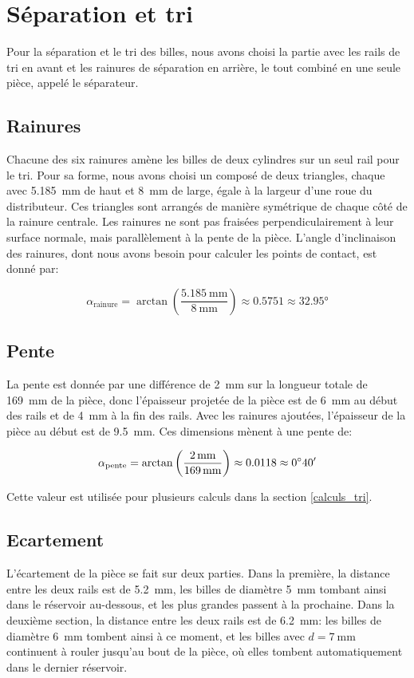 \section{Séparation et tri}
Pour la séparation et le tri des billes, nous avons choisi la partie avec les rails de tri en avant et les rainures de séparation en arrière, le tout combiné en une seule pièce, appelé le séparateur.

\subsection{Rainures}
Chacune des six rainures amène les billes de deux cylindres sur un seul rail pour le tri. Pour sa forme, nous avons choisi un composé de deux triangles, chaque avec \SI{5,185}{\milli\metre} de haut et \SI{8}{\milli\metre} de large, égale à la largeur d'une roue du distributeur. Ces triangles sont arrangés de manière symétrique de chaque côté de la rainure centrale. Les rainures ne sont pas fraisées perpendiculairement à leur surface normale, mais parallèlement à la pente de la pièce. L'angle d'inclinaison des rainures, dont nous avons besoin pour calculer les points de contact, est donné par:

\[\alpha_{\text{rainure}} = \arctan\left(\frac{\SI{5.185}{\milli\metre}}{\SI{8}{\milli\metre}}\right) \approx \num{0.5751} \approx \ang{32.95}\]

\subsection{Pente}
La pente est donnée par une différence de \SI{2}{\milli\metre} sur la longueur totale de \SI{169}{\milli\metre} de la pièce, donc l'épaisseur projetée de la pièce est de \SI{6}{\mm} au début des rails et de \SI{4}{\mm} à la fin  des rails. Avec les rainures ajoutées, l'épaisseur de la pièce au début est de \SI{9.5}{\mm}. Ces dimensions mènent à une pente de:

\[\alpha_{\text{pente}} = \arctan\left(\frac{\SI{2}{\milli\metre}}{\SI{169}{\milli\metre}}\right) \approx \num{0.0118} \approx \sisetup{add-arc-degree-zero} \ang{;40;}\]

Cette valeur est utilisée pour plusieurs calculs dans la section \ref{calculs_tri}.

\subsection{Ecartement}
L'écartement de la pièce se fait sur deux parties. Dans la première, la distance entre les deux rails est de \SI{5.2}{\mm}, les billes de diamètre \SI{5}{\mm} tombant ainsi dans le réservoir au-dessous, et les plus grandes passent à la prochaine. Dans la deuxième section, la distance entre les deux rails est de \SI{6.2}{\mm}: les billes de diamètre \SI{6}{\mm} tombent ainsi à ce moment, et les billes avec $d = \SI{7}{\mm}$ continuent à rouler jusqu'au bout de la pièce, où elles tombent automatiquement dans le dernier réservoir.

